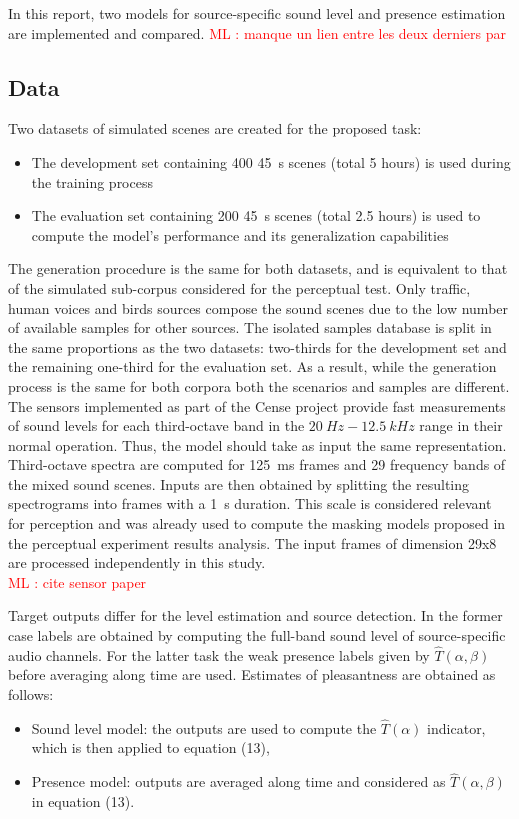\documentclass[11pt,a4paper]{article}
\newcommand{\ml}[1]{\textcolor{red}{ML : #1}}
\begin{document}
In this report, two models for source-specific sound level and presence estimation are implemented and compared. \ml{manque un lien entre les deux derniers par}

\subsection{Data}

Two datasets of simulated scenes are created for the proposed task:
\begin{itemize}
\item The development set containing 400 45~s scenes (total 5 hours) is used during the training process
\item The evaluation set containing 200 45~s scenes (total 2.5 hours) is used to compute the model's performance and its generalization capabilities
\end{itemize}

The generation procedure is the same for both datasets, and is equivalent to that of the simulated sub-corpus considered for the perceptual test. Only traffic, human voices and birds sources compose the sound scenes due to the low number of available samples for other sources. The isolated samples database is split in the same proportions as the two datasets: two-thirds for the development set and the remaining one-third for the evaluation set. As a result, while the generation process is the same for both corpora both the scenarios and samples are different.\\

The sensors implemented as part of the Cense project provide fast measurements of sound levels for each third-octave band in the $20~Hz - 12.5~kHz$ range in their normal operation. Thus, the model should take as input the same representation. Third-octave spectra are computed for 125~ms frames and 29 frequency bands of the mixed sound scenes. Inputs are then obtained by splitting the resulting spectrograms into frames with a 1~s duration. This scale is considered relevant for perception and was already used to compute the masking models proposed in the perceptual experiment results analysis. The input frames of dimension 29x8 are processed independently in this study.\\ \ml{cite sensor paper}

Target outputs differ for the level estimation and source detection. In the former case labels are obtained by computing the full-band sound level of source-specific audio channels. For the latter task the weak presence labels given by $\hat T(\alpha, \beta)$ before averaging along time are used. Estimates of pleasantness are obtained as follows:
\begin{itemize}
\item Sound level model: the outputs are used to compute the $\hat T(\alpha)$ indicator, which is then applied to equation (13),
\item Presence model: outputs are averaged along time and considered as $\hat T(\alpha, \beta)$ in equation (13).
\end{itemize}
\end{document}
